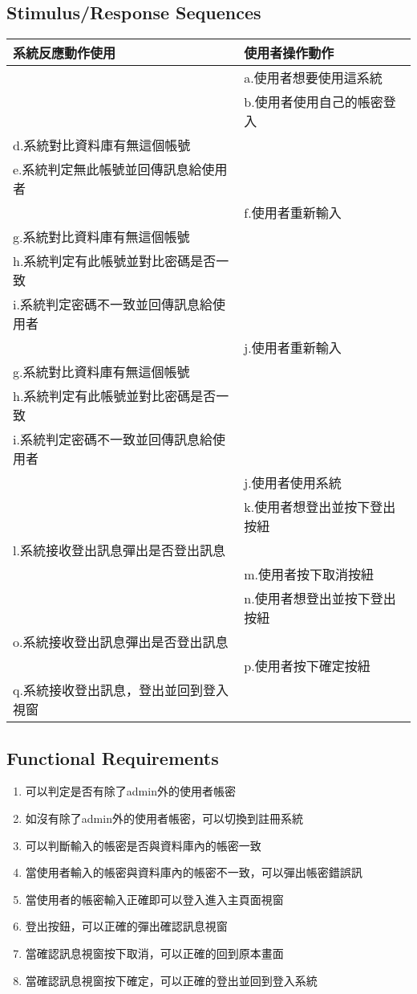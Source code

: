 \documentclass{scrreprt}
\begin{document}
\begin{CJK*}{UTF8}{bsmi}
\subsection{Stimulus/Response Sequences}
\begin{center}
\begin{tabular}{|l|l|}\hline
系統反應動作使用 & 使用者操作動作  \\ \hline
 & a.使用者想要使用這系統  \\ \hline
 & b.使用者使用自己的帳密登入  \\ \hline
d.系統對比資料庫有無這個帳號 &   \\\hline
e.系統判定無此帳號並回傳訊息給使用者 &   \\\hline
 & f.使用者重新輸入  \\\hline
g.系統對比資料庫有無這個帳號&   \\\hline
h.系統判定有此帳號並對比密碼是否一致&   \\\hline
i.系統判定密碼不一致並回傳訊息給使用者&   \\\hline
 & j.使用者重新輸入  \\\hline
g.系統對比資料庫有無這個帳號&   \\\hline
h.系統判定有此帳號並對比密碼是否一致&   \\\hline
i.系統判定密碼不一致並回傳訊息給使用者&   \\\hline
& j.使用者使用系統  \\\hline
 & k.使用者想登出並按下登出按紐		  \\\hline
l.系統接收登出訊息彈出是否登出訊息&   \\\hline
& m.使用者按下取消按紐	  \\\hline
 & n.使用者想登出並按下登出按紐  \\\hline
o.系統接收登出訊息彈出是否登出訊息&   \\\hline
 & p.使用者按下確定按紐   \\\hline
q.系統接收登出訊息，登出並回到登入視窗&   \\\hline
\end{tabular}
\end{center}
\subsection{Functional Requirements}
\begin{enumerate}
\item 可以判定是否有除了admin外的使用者帳密
\item 如沒有除了admin外的使用者帳密，可以切換到註冊系統
\item 可以判斷輸入的帳密是否與資料庫內的帳密一致
\item 當使用者輸入的帳密與資料庫內的帳密不一致，可以彈出帳密錯誤訊
\item 當使用者的帳密輸入正確即可以登入進入主頁面視窗
\item 登出按鈕，可以正確的彈出確認訊息視窗
\item 當確認訊息視窗按下取消，可以正確的回到原本畫面
\item 當確認訊息視窗按下確定，可以正確的登出並回到登入系統
\end{enumerate}

\end{CJK*}
\end{document}
